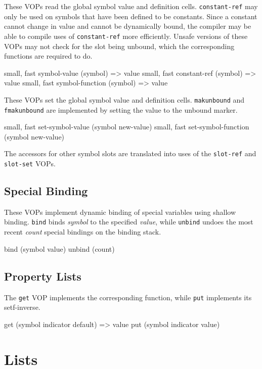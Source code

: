 {These VOPs read the global symbol value and definition cells.  {\tt constant-ref}
may only be used on symbols that have been defined to be constants.  Since a
constant cannot change in value and cannot be dynamically bound, the compiler
may be able to compile uses of {\tt constant-ref} more efficiently.  Unsafe
versions of these VOPs may not check for the slot being unbound, which the
corresponding \clisp functions are required to do.
\begin{example}
{small, fast} symbol-value (symbol) => value
{small, fast} constant-ref (symbol) => value
{small, fast} symbol-function (symbol) => value
\end{example}

These VOPs set the global symbol value and definition cells.  {\tt makunbound}
and {\tt fmakunbound} are implemented by setting the value to the unbound marker.
\begin{example}
{small, fast} set-symbol-value (symbol new-value)
{small, fast} set-symbol-function (symbol new-value)
\end{example}

The \clisp accessors for other symbol slots are translated into uses of the
{\tt slot-ref} and {\tt slot-set} VOPs.


\section{Special Binding}

These VOPs implement dynamic binding of special variables using shallow
binding.  {\tt bind} binds {\it symbol} to the specified {\it value}, while
{\tt unbind} undoes the most recent {\it count} special bindings on the binding
stack.
\begin{example}
bind (symbol value)
unbind (count)
\end{example}

\section{Property Lists}

The {\tt get} VOP implements the corresponding \clisp function, while {\tt put}
implements its setf-inverse.
\begin{example}
get (symbol indicator default) => value
put (symbol indicator value)
\end{example}

\chapter{Lists}


}
